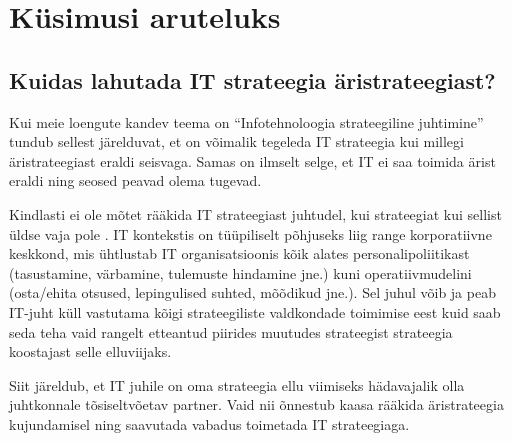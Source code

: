 \documentclass{tufte-book}
\begin{document}
\section{Küsimusi aruteluks}
\subsection{Kuidas lahutada IT strateegia äristrateegiast?}
\label{sec:strategy:q1}
Kui meie loengute kandev teema on \enquote{Infotehnoloogia strateegiline juhtimine} tundub sellest järelduvat, et on võimalik tegeleda IT strateegia kui millegi äristrateegiast eraldi seisvaga. Samas on ilmselt selge, et IT ei saa toimida ärist eraldi ning seosed peavad olema tugevad.

Kindlasti ei ole mõtet rääkida IT strateegiast juhtudel, kui strateegiat kui sellist üldse vaja pole . IT kontekstis on tüüpiliselt põhjuseks liig range korporatiivne keskkond, mis ühtlustab IT organisatsioonis kõik alates personalipoliitikast (tasustamine, värbamine, tulemuste hindamine jne.) kuni operatiivmudelini (osta/ehita otsused, lepingulised suhted, mõõdikud jne.). Sel juhul võib ja peab IT-juht küll vastutama kõigi strateegiliste valdkondade toimimise eest kuid saab seda teha vaid rangelt etteantud piirides muutudes strateegist strateegia koostajast selle elluviijaks.

Siit järeldub, et IT juhile on oma strateegia ellu viimiseks hädavajalik olla juhtkonnale tõsiseltvõetav partner. Vaid nii õnnestub kaasa rääkida äristrateegia kujundamisel ning saavutada vabadus toimetada IT strateegiaga. 
\end{document}
